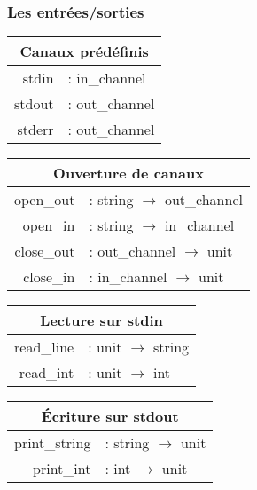 %
\begin{frame}
\frametitle{Les entrées/sorties}

\begin{tabular}{|rl|}
\hline
\multicolumn{2}{|c|}{Canaux prédéfinis}\\
\hline
\textsf{stdin} & \textsf{: in\_channel}\\
\textsf{stdout} & \textsf{: out\_channel}\\
\textsf{stderr} & \textsf{: out\_channel}\\
\hline
\end{tabular} \hspace*{5mm}
\begin{tabular}{|rl|}
\hline
\multicolumn{2}{|c|}{Ouverture de canaux}\\
\hline
\textsf{open\_out} & \textsf{: string $\rightarrow$ out\_channel}\\
\textsf{open\_in} & \textsf{: string $\rightarrow$ in\_channel}\\
\textsf{close\_out} & \textsf{: out\_channel $\rightarrow$ unit}\\
\textsf{close\_in} & \textsf{: in\_channel $\rightarrow$ unit}\\
\hline
\end{tabular}

\begin{tabular}{|rl|}
\hline
\multicolumn{2}{|c|}{Lecture sur \textsf{stdin}}\\
\hline
\textsf{read\_line} & \textsf{: unit $\rightarrow$ string}\\
\textsf{read\_int} & \textsf{: unit $\rightarrow$ int}\\
\hline
\end{tabular} \hspace*{5mm}
\begin{tabular}{|rl|}
\hline
\multicolumn{2}{|c|}{\'{E}criture sur \textsf{stdout}}\\
\hline
\textsf{print\_string} & \textsf{: string $\rightarrow$ unit}\\
\textsf{print\_int} & \textsf{: int $\rightarrow$ unit}\\
\hline
\end{tabular}

\end{frame}

